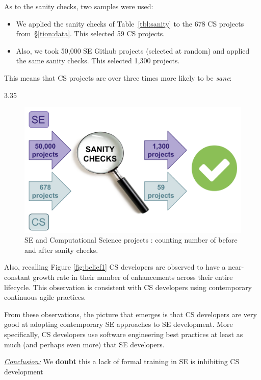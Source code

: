 \documentclass[sigconf,review,anonymous]{acmart}
\newcommand{\bi}{\begin{itemize}}
\newcommand{\ei}{\end{itemize}}
\newenvironment{RQ}{\vspace{1mm}\begin{tcolorbox}[enhanced,width=3.4in,size=fbox,colback=red!5!white,drop shadow southeast,sharp corners]}{\end{tcolorbox}}
\begin{document}
As to the sanity checks, 
two samples were used:
\bi
\item
We applied the sanity checks
of Table~\ref{tbl:sanity} to the 678 CS projects from~\S\ref{tion:data}. This selected 59 CS projects.
\item
Also, we took 50,000 SE Github projects (selected at random) and applied
the same sanity checks. This selected 1,300 projects.
\ei
This means that CS projects are over three times more likely to be {\em sane}: 

\centerline{  3.35 }

\begin{figure}
  \centering
  \includegraphics[width=\linewidth]{img/sanity.png} 
  \caption{ SE and Computational Science  projects : counting number of before and after sanity checks.}
  \label{fig:sanity}
\end{figure}
 Also, recalling Figure \ref{fig:belief1} CS developers are observed to have a near-constant growth rate in their number of enhancements across their entire lifecycle. This observation is consistent with CS developers using
  contemporary continuous agile practices. 

From these observations, the picture that emerges is that CS developers are very good at adopting contemporary  SE approaches to SE development. More specifically, CS developers
use software engineering best practices   at least as much (and perhaps even more) that SE developers. 


\begin{RQ}
\textit{\underline{Conclusion:}} We \textbf{doubt} this a lack of formal training in SE is inhibiting CS development
\end{RQ}
\end{document}
